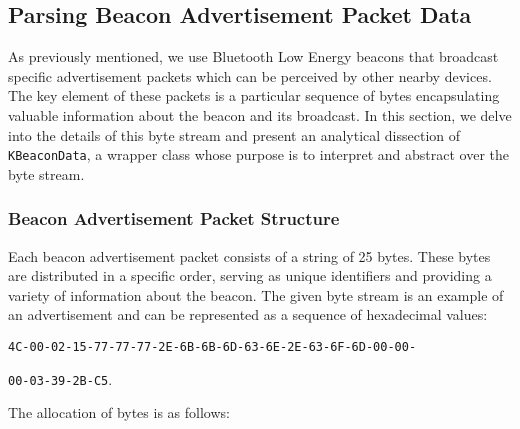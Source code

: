 \subsection{Parsing Beacon Advertisement Packet Data}

As previously mentioned, we use Bluetooth Low Energy beacons that broadcast specific advertisement packets which can be perceived by other nearby devices.
The key element of these packets is a particular sequence of bytes encapsulating valuable information about the beacon and its broadcast. 
In this section, we delve into the details of this byte stream and present an analytical dissection of \texttt{KBeaconData}, a wrapper class whose purpose is to interpret and abstract over the byte stream.

\subsubsection{Beacon Advertisement Packet Structure}
	 
Each beacon advertisement packet consists of a string of 25 bytes.
These bytes are distributed in a specific order, serving as unique identifiers and providing a variety of information about the beacon. 
The given byte stream is an example of an advertisement and can be represented as a sequence of hexadecimal values:


\noindent\texttt{4C-00-02-15-77-77-77-2E-6B-6B-6D-63-6E-2E-63-6F-6D-00-00-}


\noindent\texttt{00-03-39-2B-C5}.


The allocation of bytes is as follows:

